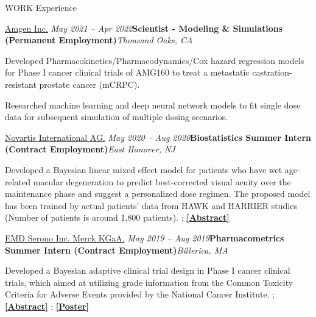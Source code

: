 \documentclass[
	11pt, %
]{resume} %
\begin{document}
\begin{rSection}{WORK Experience}
\newpage
\begin{rSubsection}{
\href{https://www.amgen.com/}{Amgen Inc.}
}{\em May 2021 -- Apr 2022}{\textbf{Scientist - Modeling \& Simulations (Permanent Employment)}}{\em Thousand Oaks, CA}
\item 
Developed Pharmacokinetics/Pharmacodynamics/Cox hazard regression models for Phase I cancer clinical trials of AMG160 to treat a metastatic castration-resistant prostate cancer (mCRPC).
\item 
Researched machine learning and deep neural network models to fit single dose data for subsequent simulation of multiple dosing scenarios. 
\end{rSubsection}

\begin{rSubsection}{
\href{https://www.pharma.us.novartis.com/}{Novartis International AG.}
}{\em May 2020 -- Aug 2020}{\textbf{Biostatistics Summer Intern (Contract Employment)}}{\em East Hanover, NJ}
\item 
Developed a Bayesian linear mixed effect model for patients who have wet age-related macular degeneration to predict best-corrected visual acuity over the maintenance phase and suggest a personalized dose regimen. The proposed model has been trained by actual patients' data from HAWK and HARRIER studies (Number of patients is around 1,800 patients). ; \href{https://sites.google.com/view/seyoonlee/home/projects/novartis-summer-internship-project?authuser=0#h.dfc3zhswkx8m}
{\underline{\textbf{[Abstract]}}}
\end{rSubsection}



\begin{rSubsection}{
\href{https://www.emdserono.com/us-en}{EMD Serono Inc. Merck KGaA.}
}{\em May 2019 -- Aug 2019}{\textbf{Pharmacometrics Summer Intern (Contract Employment)}}{\em Billerica, MA}
\item 
Developed a Bayesian adaptive clinical trial design in Phase I cancer clinical trials, which aimed at utilizing grade information from the Common Toxicity Criteria for Adverse Events provided by the National Cancer Institute. ; 
\href{https://sites.google.com/view/seyoonlee/home/projects/merck-group-summer-internship-project?authuser=0#h.lnkjghpa5ikt}
{\underline{\textbf{[Abstract]}}}
;
\href{https://www.dropbox.com/s/dnlynbzl6ojmgwh/ACOP_Se_Yoon_Lee_PhD.pdf?dl=0}
{\underline{\textbf{[Poster]}}}
\end{rSubsection}



\end{rSection}
\end{document}
